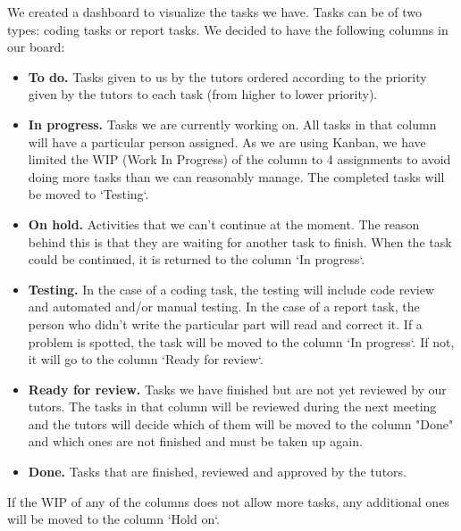 We created a dashboard to visualize the tasks we have. Tasks can be of two types: coding tasks or report tasks. We decided to have the following columns in our board:
\begin{itemize}
\item \textbf{To do.} Tasks given to us by the tutors ordered according to the priority given by the tutors to each task (from higher to lower priority). 
\item \textbf{In progress.} Tasks we are currently working on. All tasks in that column will have a particular person assigned. As we are using Kanban, we have limited the WIP (Work In Progress) of the column to 4 assignments to avoid doing more tasks than we can reasonably manage. The completed tasks will be moved to `Testing`.
\item \textbf{On hold.} Activities that we can't continue at the moment. The reason behind this is that they are waiting for another task to finish. When the task could be continued, it is returned to the column `In progress`.
\item \textbf{Testing.} In the case of a coding task, the testing will include code review and automated and/or manual testing. In the case of a report task, the person who didn't write the particular part will read and correct it. If a problem is spotted, the task will be moved to the column `In progress`. If not, it will go to the column `Ready for review`.
\item \textbf{Ready for review.}  Tasks we have finished but are not yet reviewed by our tutors. The tasks in that column will be reviewed during the next meeting and the tutors will decide which of them will be moved to the column "Done" and which ones are not finished and must be taken up again.
\item \textbf{Done.} Tasks that are finished, reviewed and approved by the tutors.
\end{itemize}

If the WIP of any of the columns does not allow more tasks, any additional ones will be moved to the column `Hold on`. 
